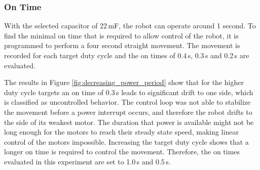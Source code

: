 \subsubsection{On Time}

With the selected capacitor of 22\,mF, the robot can operate around 1 second. 
To find the minimal on time that is required to allow control of the robot, it is programmed to perform a four second straight movement.
The movement is recorded for each target duty cycle and the on times of 0.4\,s, 0.3\,s and 0.2\,s are evaluated.

The results in Figure \ref{fig:decreasing_power_period} show that for the higher duty cycle targets an on time of 0.3\,s leads to significant drift to one side, which is classified as uncontrolled behavior.
The control loop was not able to stabilize the movement before a power interrupt occurs, and therefore the robot drifts to the side of its weakest motor.
The duration that power is available might not be long enough for the motors to reach their steady state speed, making linear control of the motors impossible.
Increasing the target duty cycle shows that a longer on time is required to control the movement. 
Therefore, the on times evaluated in this experiment are set to 1.0\,s and 0.5\,s.


